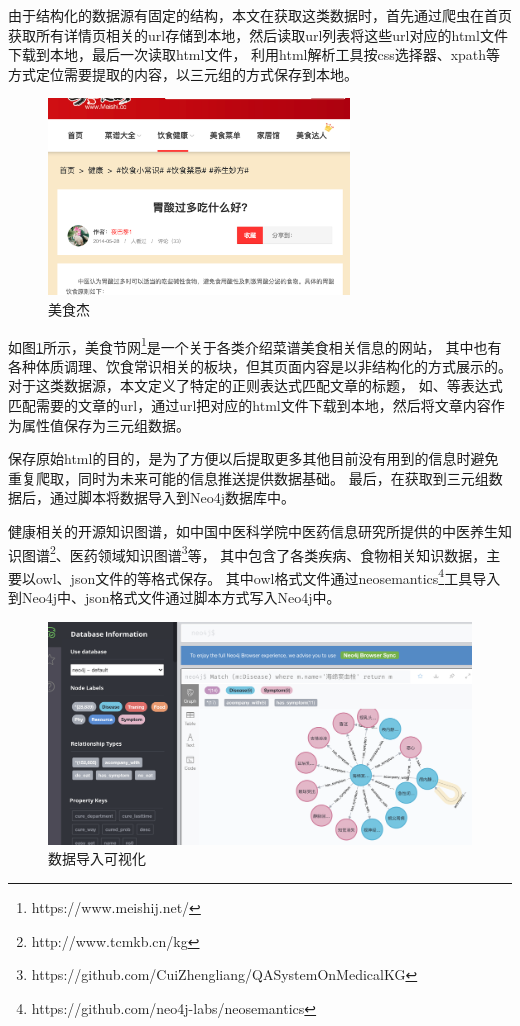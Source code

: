 由于结构化的数据源有固定的结构，本文在获取这类数据时，首先通过爬虫在首页获取所有详情页相关的url存储到本地，然后读取url列表将这些url对应的html文件下载到本地，最后一次读取html文件，
利用html解析工具按css选择器、xpath等方式定位需要提取的内容，以三元组的方式保存到本地。

\begin{figure}[h]
    \centering
    \includegraphics[width=8cm]{images/msj.png}
    \caption[]{美食杰}
    \label{fig:rel_source}
\end{figure}
如图\ref{fig:rel_source}所示，美食节网\footnote{https://www.meishij.net/}是一个关于各类介绍菜谱美食相关信息的网站，
其中也有各种体质调理、饮食常识相关的板块，但其页面内容是以非结构化的方式展示的。对于这类数据源，本文定义了特定的正则表达式匹配文章的标题，
如、等表达式匹配需要的文章的url，通过url把对应的html文件下载到本地，然后将文章内容作为属性值保存为三元组数据。

保存原始html的目的，是为了方便以后提取更多其他目前没有用到的信息时避免重复爬取，同时为未来可能的信息推送提供数据基础。
最后，在获取到三元组数据后，通过脚本将数据导入到Neo4j数据库中。


健康相关的开源知识图谱，如中国中医科学院中医药信息研究所提供的中医养生知识图谱\footnote{http://www.tcmkb.cn/kg}、医药领域知识图谱\footnote{https://github.com/CuiZhengliang/QASystemOnMedicalKG}等，
其中包含了各类疾病、食物相关知识数据，主要以owl、json文件的等格式保存。
其中owl格式文件通过neosemantics\footnote{https://github.com/neo4j-labs/neosemantics}工具导入到Neo4j中、json格式文件通过脚本方式写入Neo4j中。

\begin{figure}[h]
    \centering
    \includegraphics[width=15cm]{images/brower.png}
    \caption[]{数据导入可视化}
    \label{fig:brower}
\end{figure}

